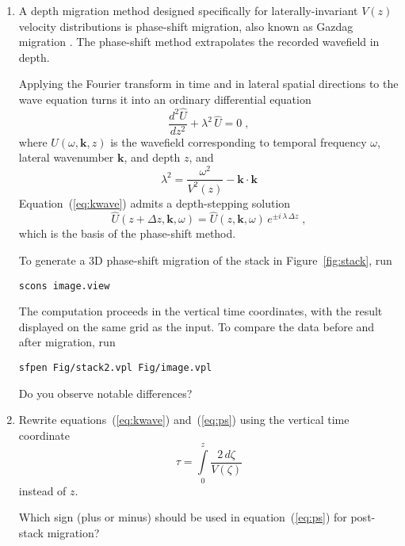\begin{enumerate}
\item A depth migration method designed specifically for laterally-invariant $V(z)$ velocity distributions is phase-shift migration, also known as Gazdag migration \cite[]{GEO43-07-13421351}. The phase-shift method extrapolates the recorded wavefield in depth.

Applying the Fourier transform in time and in lateral spatial directions to the wave equation turns it into an
ordinary differential equation
\begin{equation}
\label{eq:kwave}
\frac{d^2 \hat{U}}{d z^2} + \lambda^2\,\hat{U} = 0\;,
\end{equation}
where $U(\omega,\mathbf{k},z)$ is the wavefield corresponding to temporal frequency $\omega$, lateral wavenumber $\mathbf{k}$, and depth $z$, and
\[
\lambda^2 = \frac{\omega^2}{V^2(z)} - \mathbf{k} \cdot
\mathbf{k}
\]
Equation~(\ref{eq:kwave}) admits a depth-stepping solution
\begin{equation}
\label{eq:ps}
\hat{U}(z+\Delta z,\mathbf{k},\omega) = \hat{U}(z,\mathbf{k},\omega)\,e^{\pm i\,\lambda\,\Delta z}\;,
\end{equation}
which is the basis of the phase-shift method.

To generate a 3D phase-shift migration of the stack in Figure~\ref{fig:stack}, run
\begin{verbatim}
scons image.view
\end{verbatim}
The computation proceeds in the vertical time coordinates, with the result displayed on the same grid as the input. To compare the data before and after migration, run
\begin{verbatim}
sfpen Fig/stack2.vpl Fig/image.vpl
\end{verbatim}
Do you observe notable differences?


\item Rewrite equations~(\ref{eq:kwave}) and~(\ref{eq:ps}) using the vertical time coordinate 
\[
\tau = \int\limits_{0}^{z} \frac{2\,d\zeta}{V(\zeta)}
\]
instead of $z$. 

\answer{
}

Which sign (plus or minus) should be used in
equation~(\ref{eq:ps}) for post-stack migration?



\end{enumerate}
